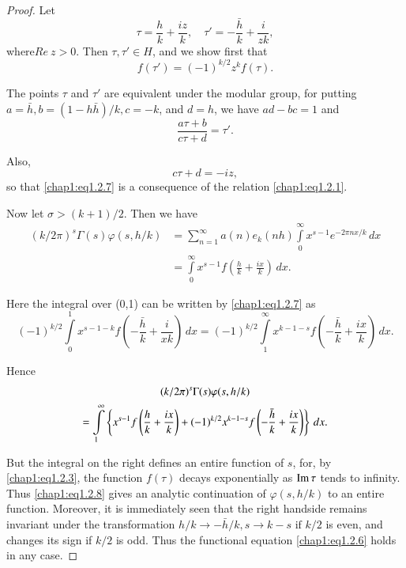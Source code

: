 \begin{proof}
Let 
$$
\tau=\frac{h}{k}+\frac{iz}{k}, \quad \tau'=-\frac{\bar{h}}{k}+
\frac{i}{zk}, 
$$
where\pageoriginale $Re~ z>0$. Then $\tau,\tau'\in H$, and we show
first that 
\begin{equation}\label{chap1:eq1.2.7}
f(\tau')=(-1)^{k/2}z^k f(\tau).
\end{equation}

The points $\tau$ and $\tau'$ are equivalent under the modular group,
for putting $a=\bar{h},b =(1-h\bar{h})/k,c =-k$, and $d=h$, we have
$ad-bc=1$ and 
$$
\frac{a\tau+b}{c\tau+d}=\tau'.
$$

Also,
$$
c\tau+d=-iz,
$$
so that \eqref{chap1:eq1.2.7} is a consequence of the relation
\eqref{chap1:eq1.2.1}. 

Now let $\sigma > (k+1)/2$. Then we have 
\begin{align*}
(k/2\pi)^s\Gamma(s)\varphi(s,h/k) &= \sum\limits_{n=1}^\infty
a(n)e_k(nh) \int\limits_0^\infty x^{s-1}e^{-2\pi nx/k}\,dx\\
&= \int\limits_0^\infty x^{s-1}f\left(\frac{h}{k}+\frac{ix}{k}
\right)\,dx. 
\end{align*}

Here the integral over (0,1) can be written by \eqref{chap1:eq1.2.7}
as 
$$
(-1)^{k/2}\int\limits_0^1x^{s-1-k} f\left(-
\frac{\bar{h}}{k}+ \frac{i}{xk}\right)\,dx=(-1)^{k/2}
\int\limits_1^\infty x^{k-1-s}f\left(-\frac{\bar{h}}{k}+
\frac{ix}{k}\right) \,dx.
$$

Hence
\begin{gather}
(k/2\pi)^s\Gamma(s)\varphi(s,h/k)\label{chap1:eq1.2.8}\\
=\int\limits_1^\infty \left\{x^{s-1}f\left(\frac{h}{k}+\frac{ix}{k}
\right)+(-1)^{k/2} x^{k-1-s}f\left(
-\frac{\bar{h}}{k}+\frac{ix}{k}\right) \right\}\,dx.\notag
\end{gather}

But the integral on the right defines an entire function of $s$, for,
by \eqref{chap1:eq1.2.3}, the function $f(\tau)$ decays exponentially
as $\operatorname{Im} \tau$ tends to infinity. Thus \eqref{chap1:eq1.2.8} gives an
analytic continuation of $\varphi(s,h/k)$ to an entire
function. Moreover, it is immediately seen that the right
hand\pageoriginale side remains invariant under the transformation
$h/k\to -\bar{h}/k, s\to k -s \text{ if } k/2$ is even,
and changes its sign if $k/2$ is odd. Thus the functional
equation \eqref{chap1:eq1.2.6} holds in any case.
\end{proof}


